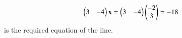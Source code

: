 \begin{align}
	\myvec{3&-4}\vec{x}=\myvec{3&-4}\myvec{-2\\3}
	=-18 
\end{align}
is the required equation of the line.
